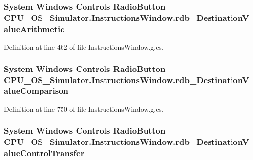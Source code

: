 \subsubsection[{rdb\+\_\+\+Destination\+Value\+Arithmetic}]{\setlength{\rightskip}{0pt plus 5cm}System Windows Controls Radio\+Button C\+P\+U\+\_\+\+O\+S\+\_\+\+Simulator.\+Instructions\+Window.\+rdb\+\_\+\+Destination\+Value\+Arithmetic\hspace{0.3cm}{\ttfamily [package]}}\label{class_c_p_u___o_s___simulator_1_1_instructions_window_a2e87a90d55ec015190b55bd06c273efc}


Definition at line 462 of file Instructions\+Window.\+g.\+cs.

\hypertarget{class_c_p_u___o_s___simulator_1_1_instructions_window_a200445a2378fddf69041aecbbcdf68fb}{}
\subsubsection[{rdb\+\_\+\+Destination\+Value\+Comparison}]{\setlength{\rightskip}{0pt plus 5cm}System Windows Controls Radio\+Button C\+P\+U\+\_\+\+O\+S\+\_\+\+Simulator.\+Instructions\+Window.\+rdb\+\_\+\+Destination\+Value\+Comparison\hspace{0.3cm}{\ttfamily [package]}}\label{class_c_p_u___o_s___simulator_1_1_instructions_window_a200445a2378fddf69041aecbbcdf68fb}


Definition at line 750 of file Instructions\+Window.\+g.\+cs.

\hypertarget{class_c_p_u___o_s___simulator_1_1_instructions_window_afedaca6e4102fbae9f5db622be1b839d}{}
\subsubsection[{rdb\+\_\+\+Destination\+Value\+Control\+Transfer}]{\setlength{\rightskip}{0pt plus 5cm}System Windows Controls Radio\+Button C\+P\+U\+\_\+\+O\+S\+\_\+\+Simulator.\+Instructions\+Window.\+rdb\+\_\+\+Destination\+Value\+Control\+Transfer\hspace{0.3cm}{\ttfamily [package]}}\label{class_c_p_u___o_s___simulator_1_1_instructions_window_afedaca6e4102fbae9f5db622be1b839d}


